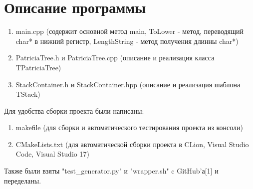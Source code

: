 \documentclass[pdf, unicode, 12pt, a4paper,oneside,fleqn]{article}
\begin{document}
\section{Описание программы}
\begin{enumerate}
\item main.cpp (содержит основной метод main, ToLower - метод, переводящий char* в нижний регистр, LengthString - метод получения длинны char*)
\item PatriciaTree.h и PatriciaTree.cpp (описание и реализация класса TPatriciaTree)
\item StackContainer.h и StackContainer.hpp (описание и реализация шаблона TStack)
\end{enumerate}
Для удобства сборки проекта были написаны: 
\begin{enumerate}
\item makefile (для сборки и автоматического тестирования проекта из консоли)
\item CMakeLists.txt (для автоматической сборки проекта в CLion, Visual Studio Code, Visual Studio 17)
\end{enumerate}
Также были взяты "test\_generator.py" и "wrapper.sh" c GitHub'а[1] и переделаны.
\newpage
\end{document}
